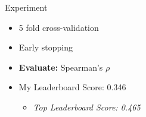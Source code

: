 \documentclass[
 size=12pt,
 paper=smartboard, %
 mode=present, %
 display=slides, %
style=tuliplab,
pauseslide,
fleqn,leqno]{powerdot}
\begin{document}
\begin{slide}{Experiment}
    \begin{itemize}
        \item 5 fold cross-validation
        \item Early stopping
        \item \textbf{Evaluate:} Spearman's $\rho$
        \item My Leaderboard Score: 0.346
        \begin{itemize}
            \item \emph{Top Leaderboard Score: 0.465}
        \end{itemize}
    \end{itemize}
\end{slide}
\end{document}
